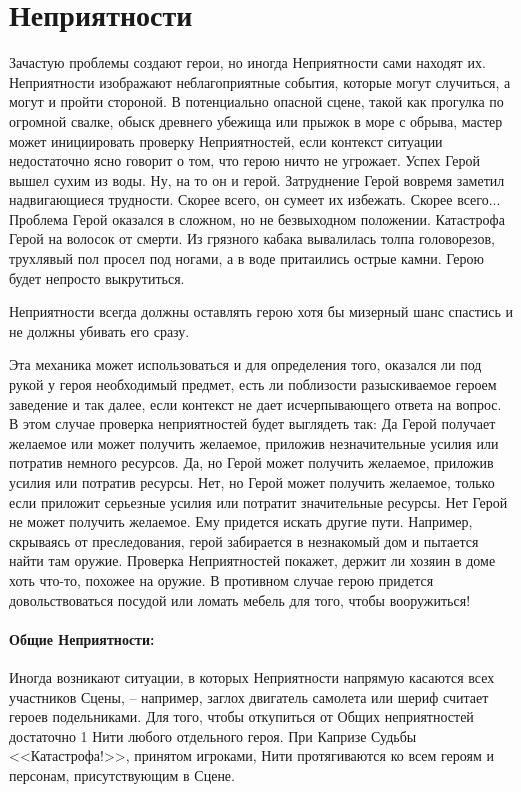 \section{Неприятности}

Зачастую проблемы создают герои, но иногда Неприятности сами находят их. Неприятности изображают неблагоприятные события, которые могут случиться, а могут и пройти стороной. В потенциально опасной сцене, такой как прогулка по огромной свалке, обыск древнего убежища или прыжок в море с обрыва, мастер может инициировать проверку Неприятностей, если контекст ситуации недостаточно ясно говорит о том, что герою ничто не угрожает.
\trouble
{Успех}%
{Герой вышел сухим из воды. Ну, на то он и герой.}%
{Затруднение}%
{Герой вовремя заметил надвигающиеся трудности. Скорее всего, он сумеет их избежать. Скорее всего...}%
{Проблема}%
{Герой оказался в сложном, но не безвыходном положении.}%
{Катастрофа}%
{Герой на волосок от смерти. Из грязного кабака вывалилась толпа головорезов, трухлявый пол просел под ногами, а в воде притаились острые камни. Герою будет непросто выкрутиться.}%
\begin{tcolorbox}
Неприятности всегда должны оставлять герою хотя бы мизерный шанс спастись и не должны убивать его сразу.
\end{tcolorbox}
Эта механика может использоваться и для определения того, оказался ли под рукой у героя необходимый предмет, есть ли поблизости разыскиваемое героем заведение и так далее, если контекст не дает исчерпывающего ответа на вопрос. В этом случае проверка неприятностей будет выглядеть так: 
\trouble
{Да}%
{Герой получает желаемое или может получить желаемое, приложив незначительные усилия или потратив немного ресурсов.}%
{Да, но}%
{Герой может получить желаемое, приложив усилия или потратив ресурсы.}%
{Нет, но}%
{Герой может получить желаемое, только если приложит серьезные усилия или потратит значительные ресурсы.}%
{Нет}%
{Герой не может получить желаемое. Ему придется искать другие пути.}%
Например, скрываясь от преследования, герой забирается в незнакомый дом и пытается найти там оружие. Проверка Неприятностей покажет, держит ли хозяин в доме хоть что-то, похожее на оружие. В противном случае герою придется довольствоваться посудой или ломать мебель для того, чтобы вооружиться!
\paragraph{Общие Неприятности:} Иногда возникают ситуации, в которых Неприятности напрямую касаются всех участников Сцены, – например, заглох двигатель самолета или шериф считает героев подельниками.
\newline Для того, чтобы откупиться от Общих неприятностей достаточно 1 Нити любого отдельного героя.
\newline При Капризе Судьбы <<Катастрофа!>>, принятом игроками, Нити протягиваются ко всем героям и персонам, присутствующим в Сцене.
